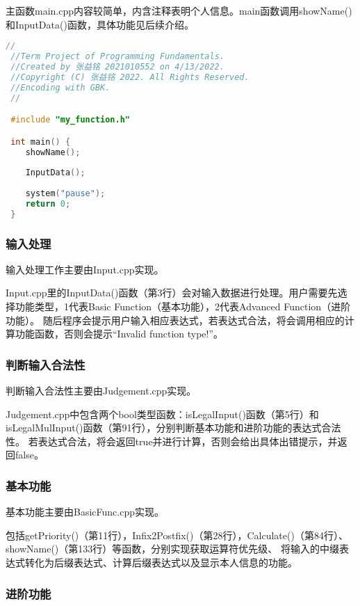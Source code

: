 \documentclass[a4paper, 11pt, UTF8]{ctexart}
\begin{document}
主函数main.cpp内容较简单，内含注释表明个人信息。main函数调用showName()和InputData()函数，具体功能见后续介绍。

\begin{lstlisting}[language=C++, basicstyle=\ttfamily]
 //
 //Term Project of Programming Fundamentals.
 //Created by 张益铭 2021010552 on 4/13/2022.
 //Copyright (C) 张益铭 2022. All Rights Reserved.
 //Encoding with GBK.
 //

 #include "my_function.h"

 int main() {
    showName();
    
    InputData();
    
    system("pause");
    return 0;
 }    
\end{lstlisting}

\subsubsection{输入处理}

输入处理工作主要由Input.cpp实现。

Input.cpp里的InputData()函数（第3行）会对输入数据进行处理。用户需要先选择功能类型，1代表Basic Function（基本功能），2代表Advanced Function（进阶功能）。
随后程序会提示用户输入相应表达式，若表达式合法，将会调用相应的计算功能函数，否则会提示“Invalid function type!”。

\subsubsection{判断输入合法性}

判断输入合法性主要由Judgement.cpp实现。

Judgement.cpp中包含两个bool类型函数：isLegalInput()函数（第5行）和isLegalMulInput()函数（第91行），分别判断基本功能和进阶功能的表达式合法性。
若表达式合法，将会返回true并进行计算，否则会给出具体出错提示，并返回false。

\subsubsection{基本功能}

基本功能主要由BasicFunc.cpp实现。

包括getPriority()（第11行），Infix2Postfix()（第28行），Calculate()（第84行）、showName()（第133行）等函数，分别实现获取运算符优先级、
将输入的中缀表达式转化为后缀表达式、计算后缀表达式以及显示本人信息的功能。

\subsubsection{进阶功能}
\end{document}
